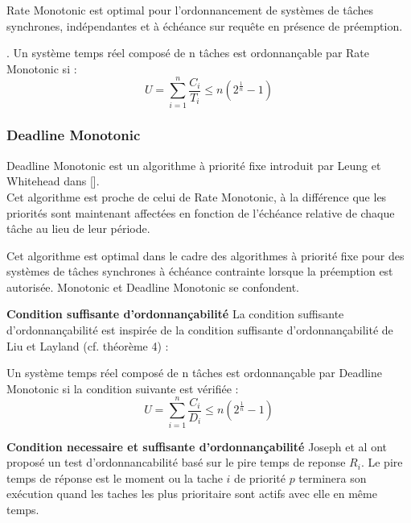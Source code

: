 \begin{theoreme}
Rate Monotonic est optimal pour l'ordonnancement de systèmes de tâches synchrones, indépendantes et à échéance sur requête en présence de préemption.
\end{theoreme}

\begin{theoreme}. Un système temps réel composé de n tâches est ordonnançable par Rate Monotonic si :
\begin{equation}
U = \sum_{i=1}^n \frac{C_i}{T_i} \leq n ( 2^{\frac{1}{n}} - 1)
\end{equation}
\end{theoreme}

\subsubsection{Deadline Monotonic \cite{LW82}}
\vspace{-1cm}
Deadline Monotonic est un algorithme à priorité fixe introduit par Leung et Whitehead dans [\cite{LW82}].\\
Cet algorithme est proche de celui de Rate Monotonic, à la différence que les priorités sont maintenant affectées en fonction de l'échéance relative de chaque tâche au lieu de leur période.
\begin{theoreme}
Cet algorithme est optimal dans le cadre des algorithmes à priorité fixe pour des systèmes de tâches synchrones à échéance contrainte lorsque la préemption est autorisée. Monotonic et Deadline Monotonic se confondent.
\end{theoreme}

\textbf{Condition suffisante d'ordonnançabilité} La condition suffisante d'ordonnançabilité est inspirée de la condition suffisante d'ordonnançabilité de Liu et Layland (cf. théorème 4) :

\begin{theoreme}
 Un système temps réel composé de n tâches est ordonnançable par Deadline
Monotonic si la condition suivante est vérifiée :
\begin{equation}
U = \sum_{i=1}^n \frac{C_i}{D_i} \leq n ( 2^{\frac{1}{n}} - 1)
\end{equation}
\end{theoreme}

\textbf{Condition necessaire et suffisante d'ordonnançabilité} Joseph et al \cite{JP86} ont proposé un test d’ordonnancabilité basé sur le pire
temps de reponse $R_{i}$.  Le pire temps de réponse est le moment ou la tache $i$ de priorité $p$ terminera son exécution quand les taches les plus prioritaire sont actifs avec elle en même temps.\\

